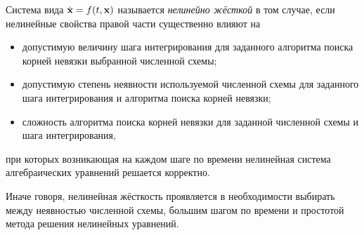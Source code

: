 \begin{definition}
    \label{def:nonlinear_stiffness}
    Система вида $ \dot{\mathbf{x}} = f(t, \mathbf{x}) $ называется \emph{нелинейно жёсткой} в том случае,
    если нелинейные свойства правой части существенно влияют на
    \begin{itemize}[itemsep=0em]
        \item
            допустимую величину шага интегрирования для заданного алгоритма поиска корней невязки выбранной численной схемы;
        \item
            допустимую степень неявности используемой численной схемы для заданного шага интегрирования и алгоритма поиска корней невязки;
        \item
            сложность алгоритма поиска корней невязки для заданной численной схемы и шага интегрирования,
    \end{itemize}
    при которых возникающая на каждом шаге по времени нелинейная система алгебраических уравнений решается корректно.
\end{definition}

Иначе говоря, нелинейная жёсткость проявляется в необходимости выбирать между неявностью численной схемы,
большим шагом по времени и простотой метода решения нелинейных уравнений.


